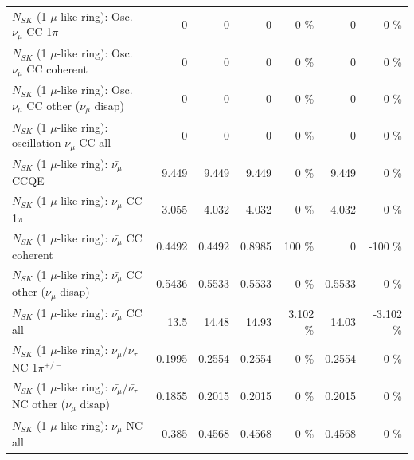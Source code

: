 \begin{table}
\begin{tabular}{| l | r | r | r  r | r  r |}
                          $N_{SK}$ (1 $\mu$-like ring): Osc. $\nu_\mu$ CC 1$\pi$ &               0 &               0 &               0 &        0 \%  &               0 &        0 \%  \\ 
                        $N_{SK}$ (1 $\mu$-like ring): Osc. $\nu_\mu$ CC coherent &               0 &               0 &               0 &        0 \%  &               0 &        0 \%  \\ 
         $N_{SK}$ (1 $\mu$-like ring): Osc. $\nu_\mu$ CC other ($\nu_\mu$ disap) &               0 &               0 &               0 &        0 \%  &               0 &        0 \%  \\ 
                      $N_{SK}$ (1 $\mu$-like ring): oscillation $\nu_\mu$ CC all &               0 &               0 &               0 &        0 \%  &               0 &        0 \%  \\ 
\hline
\hline
                              $N_{SK}$ (1 $\mu$-like ring): $\bar{\nu_\mu}$ CCQE &           9.449 &           9.449 &           9.449 &        0 \%  &           9.449 &        0 \%  \\ 
                         $N_{SK}$ (1 $\mu$-like ring): $\bar{\nu_\mu}$ CC 1$\pi$ &           3.055 &           4.032 &           4.032 &        0 \%  &           4.032 &        0 \%  \\ 
                       $N_{SK}$ (1 $\mu$-like ring): $\bar{\nu_\mu}$ CC coherent &          0.4492 &          0.4492 &          0.8985 &      100 \%  &               0 &     -100 \%  \\ 
        $N_{SK}$ (1 $\mu$-like ring): $\bar{\nu_\mu}$ CC other ($\nu_\mu$ disap) &          0.5436 &          0.5533 &          0.5533 &        0 \%  &          0.5533 &        0 \%  \\ 
                          $N_{SK}$ (1 $\mu$-like ring): $\bar{\nu_{\mu}}$ CC all &            13.5 &           14.48 &           14.93 &    3.102 \%  &           14.03 &   -3.102 \%  \\ 
\hline
  $N_{SK}$ (1 $\mu$-like ring): $\bar{\nu_\mu}$/$\bar{\nu_\tau}$ NC 1$\pi^{+/-}$ &          0.1995 &          0.2554 &          0.2554 &        0 \%  &          0.2554 &        0 \%  \\ 
$N_{SK}$ (1 $\mu$-like ring): $\bar{\nu_\mu}$/$\bar{\nu_\tau}$ NC other ($\nu_\mu$ disap) &          0.1855 &          0.2015 &          0.2015 &        0 \%  &          0.2015 &        0 \%  \\ 
                          $N_{SK}$ (1 $\mu$-like ring): $\bar{\nu_{\mu}}$ NC all &           0.385 &          0.4568 &          0.4568 &        0 \%  &          0.4568 &        0 \%  \\ 

\end{tabular}
\end{table}
